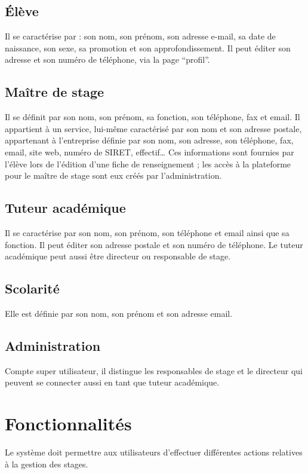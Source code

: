 \documentclass{scrreprt}
\begin{document}
\subsection{\'El\`eve}
Il se caract\'erise par : son nom, son pr\'enom, son adresse e-mail, sa date de naissance, son sexe, sa promotion et son approfondissement. Il peut \'editer son adresse et son num\'ero de t\'el\'ephone, via la page “profil”.

\subsection{Ma\^itre de stage}
Il se d\'efinit par son nom, son pr\'enom, sa fonction, son t\'el\'ephone, fax et email. Il appartient \`a un service, lui-m\^eme caract\'eris\'e par son nom et son adresse postale, appartenant à l’entreprise définie par son nom, son adresse, son t\'el\'ephone, fax, email, site web,  num\'ero de SIRET, effectif… Ces informations sont fournies par l’\'el\`eve lors de l’\'edition d’une fiche de renseignement ; les acc\`es \`a la plateforme pour le ma\^itre de stage sont eux cr\'eés par l’administration.

\subsection{Tuteur acad\'emique}
Il se caract\'erise par son nom, son pr\'enom, son t\'el\'ephone et email ainsi que sa fonction. Il peut \'editer son adresse postale et son num\'ero de t\'el\'ephone.
Le tuteur acad\'emique peut aussi \^etre directeur ou responsable de stage.

\newpage
\subsection{Scolarit\'e}
Elle est d\'efinie par son nom, son pr\'enom et son adresse email.

\subsection{Administration}
Compte super utilisateur, il distingue les responsables de stage et le directeur qui peuvent se connecter aussi en tant que tuteur acad\'emique.

\section{Fonctionnalit\'es}
Le syst\`eme doit permettre aux utilisateurs d’effectuer diff\'erentes actions relatives à la gestion des stages.
\end{document}
